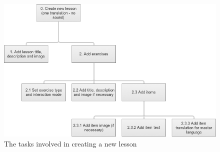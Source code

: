 
\begin{figure}[h]
 \centering
 \includegraphics[width=12cm]{images/task-analysis/create_lesson}
 \caption{The tasks involved in creating a new lesson}
 \label{fig:build}
\end{figure}



